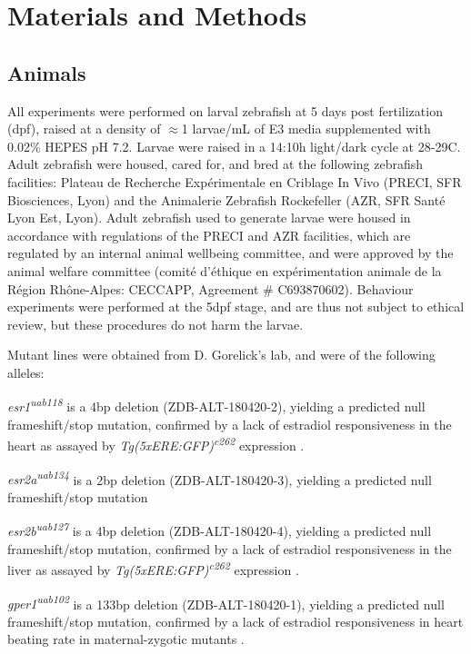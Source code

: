 \documentclass[9.5pt,lineno]{RandlettLab_elife}
\begin{document}
{\section{Materials and Methods}

\subsection{Animals}

All experiments were performed on larval zebrafish at 5 days post fertilization (dpf), raised at a density of $\approx$1 larvae/mL of E3 media supplemented with 0.02\% HEPES pH 7.2. 
Larvae were raised in a 14:10h light/dark cycle at 28-29\degree{}C. 
Adult zebrafish were housed, cared for, and bred at the following zebrafish facilities: Plateau de Recherche Expérimentale en Criblage In Vivo (PRECI, SFR Biosciences, Lyon) and the Animalerie Zebrafish Rockefeller (AZR, SFR Santé Lyon Est, Lyon). Adult zebrafish used to generate larvae were housed in accordance with regulations of the PRECI and AZR facilities, which are regulated by an internal animal wellbeing committee, and were approved by the animal welfare committee (comité d’éthique en expérimentation animale de la Région Rhône-Alpes: CECCAPP, Agreement \# C693870602). 
Behaviour experiments were performed at the 5dpf stage, and are thus not subject to ethical review, but these procedures do not harm the larvae. 

Mutant lines were obtained from D. Gorelick's lab, and were of the following alleles: 

\emph{esr1\textsuperscript{uab118}} is a 4bp deletion (ZDB-ALT-180420-2), yielding a predicted null frameshift/stop mutation, confirmed by a lack of estradiol responsiveness in the heart as assayed by \emph{Tg(5xERE:GFP)\textsuperscript{c262}} expression \citep{Romano2017-ep}. 

\emph{esr2a\textsuperscript{uab134}} is a 2bp deletion (ZDB-ALT-180420-3), yielding a predicted null frameshift/stop mutation \citep{Romano2017-ep}

\emph{esr2b\textsuperscript{uab127}} is a 4bp deletion (ZDB-ALT-180420-4), yielding a predicted null frameshift/stop mutation, confirmed by a lack of estradiol responsiveness in the liver as assayed by \emph{Tg(5xERE:GFP)\textsuperscript{c262}} expression \citep{Romano2017-ep}. 

\emph{gper1\textsuperscript{uab102}} is a 133bp deletion (ZDB-ALT-180420-1), yielding a predicted null frameshift/stop mutation, confirmed by a lack of estradiol responsiveness in heart beating rate in maternal-zygotic mutants \citep{Romano2017-ep}.

}
\end{document}
